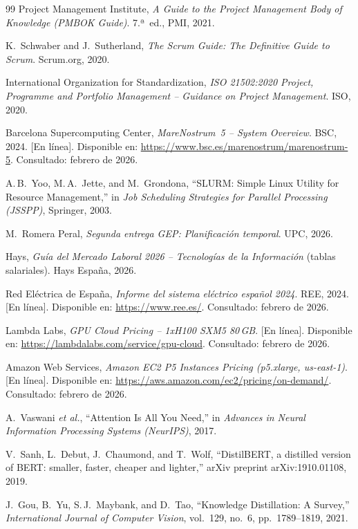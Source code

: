 \documentclass[11pt,a4paper]{article}
\begin{document}
\begin{thebibliography}{99}
Project Management Institute, \textit{A Guide to the Project Management Body of Knowledge (PMBOK Guide)}. 7.ª~ed., PMI, 2021.

K.~Schwaber and J.~Sutherland, \textit{The Scrum Guide: The Definitive Guide to Scrum}. Scrum.org, 2020.

International Organization for Standardization, \textit{ISO 21502:2020 Project, Programme and Portfolio Management -- Guidance on Project Management}. ISO, 2020.

Barcelona Supercomputing Center, \textit{MareNostrum~5 -- System Overview}. BSC, 2024. [En línea]. Disponible en: \url{https://www.bsc.es/marenostrum/marenostrum-5}. Consultado: febrero de 2026.

A.\,B.~Yoo, M.\,A.~Jette, and M.~Grondona, ``SLURM: Simple Linux Utility for Resource Management,'' in \textit{Job Scheduling Strategies for Parallel Processing (JSSPP)}, Springer, 2003.

M.~Romera Peral, \textit{Segunda entrega GEP: Planificación temporal}. UPC, 2026.

Hays, \textit{Guía del Mercado Laboral 2026 -- Tecnologías de la Información} (tablas salariales). Hays España, 2026.

Red Eléctrica de España, \textit{Informe del sistema eléctrico español 2024}. REE, 2024. [En línea]. Disponible en: \url{https://www.ree.es/}. Consultado: febrero de 2026.

Lambda Labs, \textit{GPU Cloud Pricing -- 1xH100 SXM5 80\,GB}. [En línea]. Disponible en: \url{https://lambdalabs.com/service/gpu-cloud}. Consultado: febrero de 2026.

Amazon Web Services, \textit{Amazon EC2 P5 Instances Pricing (p5.xlarge, us-east-1)}. [En línea]. Disponible en: \url{https://aws.amazon.com/ec2/pricing/on-demand/}. Consultado: febrero de 2026.

A.~Vaswani \textit{et al.}, ``Attention Is All You Need,'' in \textit{Advances in Neural Information Processing Systems (NeurIPS)}, 2017.

V.~Sanh, L.~Debut, J.~Chaumond, and T.~Wolf, ``DistilBERT, a distilled version of BERT: smaller, faster, cheaper and lighter,'' arXiv preprint arXiv:1910.01108, 2019.

J.~Gou, B.~Yu, S.\,J.~Maybank, and D.~Tao, ``Knowledge Distillation: A Survey,'' \textit{International Journal of Computer Vision}, vol.~129, no.~6, pp.~1789--1819, 2021.


\end{thebibliography}
\end{document}
